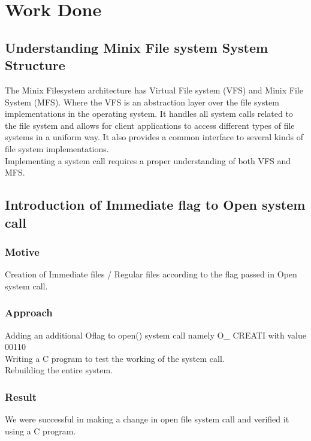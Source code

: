 \chapter{Work Done}

\section{Understanding Minix File system System Structure}

The Minix Filesystem architecture has Virtual File system (VFS) and Minix File System (MFS). Where the VFS is an abstraction layer over the file system implementations in the operating system. It handles all system calls related to the file system and allows for client applications to access different types of file systems in a uniform way. It also provides a common interface to several kinds of file system implementations. \\
Implementing a system call requires a proper understanding of both VFS and MFS.

\section{Introduction of Immediate flag to Open system call}
\subsection{Motive}
Creation of Immediate files / Regular files according to the flag passed in Open system call.
\subsection{Approach}
Adding an additional Oflag to open() system call namely O\_ CREATI  with value 00110 \\	
Writing a C program to test the working of the system call.\\
Rebuilding the entire system.
\subsection{Result}
We were successful in making a change in open file system call and verified it using a C program.



